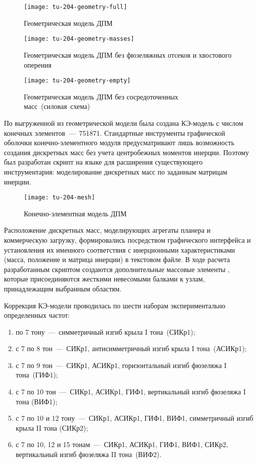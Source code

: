 \begin{figure}[!htb]
	\centerfloat
	\texttt{[image: tu-204-geometry-full]}
	\caption{Геометрическая модель ДПМ} \label{fig:tu-204-geometry-full}
\end{figure}

\begin{figure}[!htb]
	\centerfloat
	\texttt{[image: tu-204-geometry-masses]}
	\caption{Геометрическая модель ДПМ без фюзеляжных отсеков и хвостового оперения} \label{fig:tu-204-geometry-masses}
\end{figure}

\begin{figure}[!htb]
	\centerfloat
	\texttt{[image: tu-204-geometry-empty]}
	\caption{Геометрическая модель ДПМ без сосредоточенных масс~(силовая~схема)} \label{fig:tu-204-geomtery-empty}
\end{figure}

По выгруженной из  геометрической модели была создана КЭ-модель   с числом конечных элементов~---~751871. Стандартные инструменты графической оболочки конечно-элементного модуля  предусматривают лишь возможность создания дискретных масс без учета центробежных моментов инерции. Поэтому был разработан скрипт на языке  для расширения существующего инструментария: моделирование дискретных масс по заданным матрицам инерции. 

\begin{figure}[!htb]
	\centerfloat
	\texttt{[image: tu-204-mesh]}
	\caption{Конечно-элементная модель ДПМ} \label{fig:tu-204-mesh}
\end{figure}

Расположение дискретных масс, моделирующих агрегаты планера и коммерческую загрузку, формировались посредством графического интерфейса  и установления их именного соответствия с инерционными характеристиками (масса, положение и матрица инерции) в текстовом файле. В ходе расчета разработанным скриптом создаются дополнительные массовые элементы , которые присоединяются жесткими невесомыми балками к узлам, принадлежащим выбранным областям. 

Коррекция КЭ-модели проводилась по шести наборам экспериментально определенных частот:
\begin{enumerate}
	\item по 7 тону~---~симметричный изгиб крыла I тона~(СИКр1);
	\item с 7 по 8 тон~---~СИКр1, антисимметричный изгиб крыла I тона~(АСИКр1);
	\item с 7 по 9 тон~---~СИКр1, АСИКр1, горизонтальный изгиб фюзеляжа I тона~(ГИФ1);
	\item с 7 по 10 тон~---~СИКр1, АСИКр1, ГИФ1, вертикальный изгиб фюзеляжа I тона (ВИФ1);
	\item с 7 по 10 и 12 тону~---~СИКр1, АСИКр1, ГИФ1, ВИФ1, симметричный изгиб крыла II тона (СИКр2);
	\item с 7 по 10, 12 и 15 тонам~---~СИКр1, АСИКр1, ГИФ1, ВИФ1, СИКр2, вертикальный изгиб фюзеляжа II тона~(ВИФ2).
\end{enumerate}

